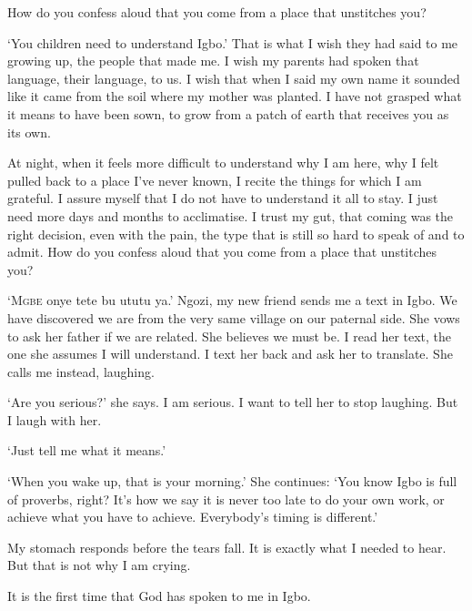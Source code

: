 \documentclass[../main.tex]{subfiles}
\begin{document}
\begin{multicols}{2}
\begin{pullquote}
 How do you confess aloud that you come from a place that unstitches you? 
\end{pullquote}

‘You children need to understand Igbo.’ That is what I wish they had said to me growing up, the people that made me. I wish my parents had spoken that language, their language, to us. I wish that when I said my own name it sounded like it came from the soil where my mother was planted. I have not grasped what it means to have been sown, to grow from a patch of earth that receives you as its own. 

At night, when it feels more difficult to understand why I am here, why I felt pulled back to a place I’ve never known, I recite the things for which I am grateful. I assure myself that I do not have to understand it all to stay. I just need more days and months to acclimatise. I trust my gut, that coming was the right decision, even with the pain, the type that is still so hard to speak of and to admit. How do you confess aloud that you come from a place that unstitches you? 

\lettrine{‘M}{gbe} onye tete bu ututu ya.’ Ngozi, my new friend sends me a text in Igbo. We have discovered we are from the very same village on our paternal side. She vows to ask her father if we are related. She believes we must be. I read her text, the one she assumes I will understand. I text her back and ask her to translate. She calls me instead, laughing. 

‘Are you serious?’ she says. I am serious. I want to tell her to stop laughing. But I laugh with her. 

‘Just tell me what it means.’ 

‘When you wake up, that is your morning.’ She continues: ‘You know Igbo is full of proverbs, right? It’s how we say it is never too late to do your own work, or achieve what you have to achieve. Everybody’s timing is different.’ 

My stomach responds before the tears fall. It is exactly what I needed to hear. But that is not why I am crying. 

It is the first time that God has spoken to me in Igbo. 

\end{multicols}
\end{document}
